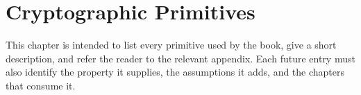 \chapter{Cryptographic Primitives}
\label{chap:cryptographic-primitives}


This chapter is intended to list every primitive used by the book, give a
short description, and refer the reader to the relevant appendix. Each future
entry must also identify the property it supplies, the assumptions it adds,
and the chapters that consume it.
